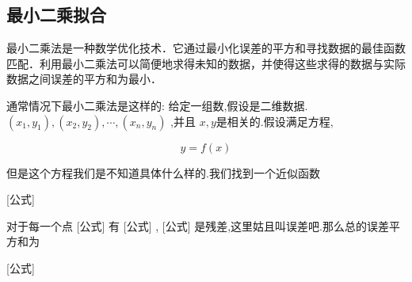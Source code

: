 
\subsection{最小二乘拟合}
最小二乘法是一种数学优化技术．它通过最小化误差的平方和寻找数据的最佳函数匹配．利用最小二乘法可以简便地求得未知的数据，并使得这些求得的数据与实际数据之间误差的平方和为最小．

通常情况下最小二乘法是这样的:
给定一组数,假设是二维数据.$(x_1,y_1),(x_2,y_2),\cdots,(x_n,y_n)$ ,并且 $x,y$是相关的.假设满足方程,

\begin{equation}
y=f(x)
\end{equation}


但是这个方程我们是不知道具体什么样的.我们找到一个近似函数

[公式]

对于每一个点 [公式] 有 [公式] , [公式] 是残差,这里姑且叫误差吧.那么总的误差平方和为

[公式]